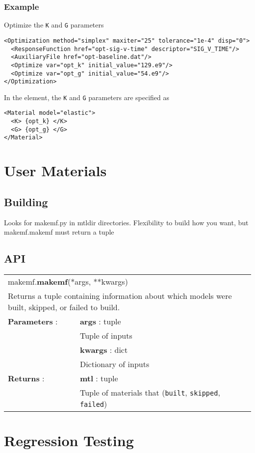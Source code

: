 \documentclass[11pt]{report}
\newcommand{\ih}[1][1]{\indent\hspace{.#1in}}
\newcommand{\reqdtag}[1]{\Red{\texttt{<#1>}}}
\begin{document}
\subsection{Example}
Optimize the \texttt{K} and \texttt{G} parameters
\begin{verbatim}
<Optimization method="simplex" maxiter="25" tolerance="1e-4" disp="0">
  <ResponseFunction href="opt-sig-v-time" descriptor="SIG_V_TIME"/>
  <AuxiliaryFile href="opt-baseline.dat"/>
  <Optimize var="opt_k" initial_value="129.e9"/>
  <Optimize var="opt_g" initial_value="54.e9"/>
</Optimization>
\end{verbatim}

In the \reqdtag{Material} element, the \texttt{K} and \texttt{G} parameters
are specified as
%
\begin{verbatim}
<Material model="elastic">
  <K> {opt_k} </K>
  <G> {opt_g} </G>
</Material>
\end{verbatim}

\chapter{User Materials}

\section{Building}
Looks for makemf.py in mtldir directories.  Flexibility to build how you want,
but makemf.makemf must return a tuple

\section{API}
\begin{tabular}[h!]{lp{3in}}
  \multicolumn{2}{p{3in}}{makemf.\textbf{makemf}(*args, **kwargs)} \\
  \multicolumn{2}{p{\textwidth}}{
    \hfill\begin{minipage}{\dimexpr\textwidth-.2in}
      Returns a tuple containing information about which models were built,
      skipped, or failed to build.
    \end{minipage}} \\[5pt]
  \ih[2]\textbf{Parameters} : & \textbf{args} : tuple \\
                              & \ih[1] Tuple of inputs \\[3pt]
                              & \textbf{kwargs} : dict \\
                              & \ih[1] Dictionary of inputs\\[5pt]
  \ih[2]\textbf{Returns} :    & \textbf{mtl} : tuple \\
                              & \ih[1] Tuple of materials that
                              (\texttt{built}, \texttt{skipped}, \texttt{failed}) \\
\end{tabular}



\chapter{Regression Testing}
\end{document}
